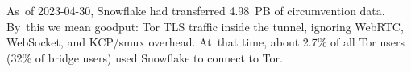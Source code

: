 \documentclass[letterpaper,twocolumn]{article}
\begin{document}
As~of \mbox{2023-04-30},
Snowflake had transferred 4.98~PB of circumvention data.
By~this we mean goodput: Tor TLS traffic inside the tunnel,
ignoring WebRTC, WebSocket, and KCP/\allowbreak smux overhead.
At~that time, about 2.7\% of all Tor users
(32\% of bridge users) used Snowflake to connect to Tor.
\end{document}
